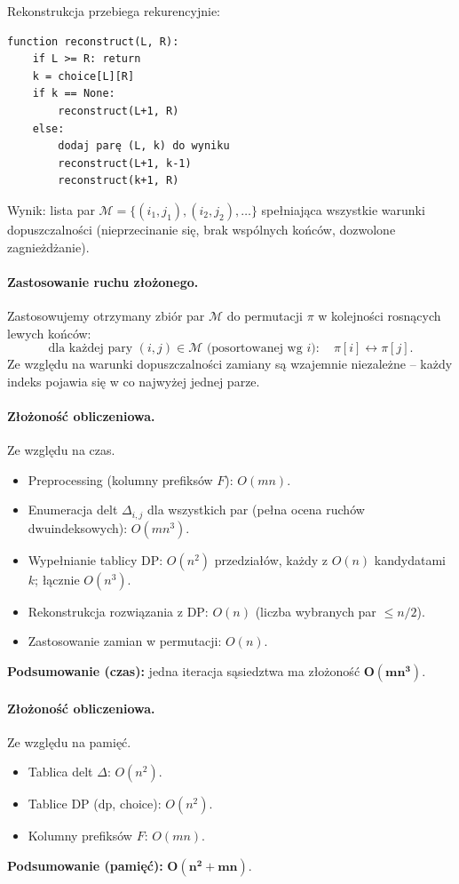 Rekonstrukcja przebiega rekurencyjnie:
\begin{verbatim}
function reconstruct(L, R):
    if L >= R: return
    k = choice[L][R]
    if k == None:
        reconstruct(L+1, R)
    else:
        dodaj parę (L, k) do wyniku
        reconstruct(L+1, k-1)
        reconstruct(k+1, R)
\end{verbatim}

Wynik: lista par $\mathcal{M} = \{(i_1, j_1), (i_2, j_2), \ldots\}$ spełniająca wszystkie warunki dopuszczalności (nieprzecinanie się, brak wspólnych końców, dozwolone zagnieżdżanie).

\paragraph{Zastosowanie ruchu złożonego.} Zastosowujemy otrzymany zbiór par $\mathcal{M}$ do permutacji $\pi$ w kolejności rosnących lewych końców:
\[
\text{dla każdej pary } (i,j) \in \mathcal{M} \text{ (posortowanej wg } i\text{)}: \quad \pi[i] \leftrightarrow \pi[j].
\]
Ze względu na warunki dopuszczalności zamiany są wzajemnie niezależne -- każdy indeks pojawia się w co najwyżej jednej parze.
\paragraph{Złożoność obliczeniowa.} Ze względu na czas.
\begin{itemize}
  \item Preprocessing (kolumny prefiksów $F$): $O(mn)$.
  \item Enumeracja delt $\Delta_{i,j}$ dla wszystkich par (pełna ocena ruchów dwuindeksowych): $O(mn^3)$.
  \item Wypełnianie tablicy DP: $O(n^2)$ przedziałów, każdy z $O(n)$ kandydatami $k$; łącznie $O(n^3)$.
  \item Rekonstrukcja rozwiązania z DP: $O(n)$ (liczba wybranych par $\le n/2$).
  \item Zastosowanie zamian w permutacji: $O(n)$.
\end{itemize}
\noindent
\textbf{Podsumowanie (czas):} jedna iteracja sąsiedztwa ma złożoność $\mathbf{O(mn^3)}$.

\medskip
\paragraph{Złożoność obliczeniowa.} Ze względu na pamięć.
\begin{itemize}
  \item Tablica delt $\Delta$: $O(n^2)$.
  \item Tablice DP ($\mathrm{dp}$, $\mathrm{choice}$): $O(n^2)$.
  \item Kolumny prefiksów $F$: $O(mn)$.
\end{itemize}
\noindent
\textbf{Podsumowanie (pamięć):} $\mathbf{O(n^2 + mn)}$.


